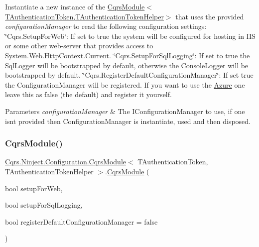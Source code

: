 Instantiate a new instance of the \hyperlink{classCqrs_1_1Ninject_1_1Configuration_1_1CqrsModule_a31a1047d3940842b760ad2a796aa1606_a31a1047d3940842b760ad2a796aa1606}{Cqrs\+Module$<$\+T\+Authentication\+Token,\+T\+Authentication\+Token\+Helper$>$} that uses the provided {\itshape configuration\+Manager}  to read the following configuration settings\+: \char`\"{}\+Cqrs.\+Setup\+For\+Web\char`\"{}\+: If set to true the system will be configured for hosting in I\+IS or some other web-\/server that provides access to System.\+Web.\+Http\+Context.\+Current. \char`\"{}\+Cqrs.\+Setup\+For\+Sql\+Logging\char`\"{}\+: If set to true the Sql\+Logger will be bootstrapped by default, otherwise the Console\+Logger will be bootstrapped by default. \char`\"{}\+Cqrs.\+Register\+Default\+Configuration\+Manager\char`\"{}\+: If set true the Configuration\+Manager will be registered. If you want to use the \hyperlink{namespaceCqrs_1_1Ninject_1_1Azure}{Azure} one leave this as false (the default) and register it yourself. 


\begin{DoxyParams}{Parameters}
{\em configuration\+Manager} & The I\+Configuration\+Manager to use, if one isn\textquotesingle{}t provided then Configuration\+Manager is instantiate, used and then disposed.\\
\hline
\end{DoxyParams}
\mbox{\label{classCqrs_1_1Ninject_1_1Configuration_1_1CqrsModule_a197055fca498bff31fd9a91a2a07292d_a197055fca498bff31fd9a91a2a07292d}} 
\subsubsection{\texorpdfstring{Cqrs\+Module()}{CqrsModule()}\hspace{0.1cm}{\footnotesize\ttfamily [2/2]}}
{\footnotesize\ttfamily \hyperlink{classCqrs_1_1Ninject_1_1Configuration_1_1CqrsModule}{Cqrs.\+Ninject.\+Configuration.\+Cqrs\+Module}$<$ T\+Authentication\+Token, T\+Authentication\+Token\+Helper $>$.\hyperlink{classCqrs_1_1Ninject_1_1Configuration_1_1CqrsModule}{Cqrs\+Module} (\begin{DoxyParamCaption}\item[{bool}]{setup\+For\+Web,  }\item[{bool}]{setup\+For\+Sql\+Logging,  }\item[{bool}]{register\+Default\+Configuration\+Manager = {\ttfamily false} }\end{DoxyParamCaption})}



